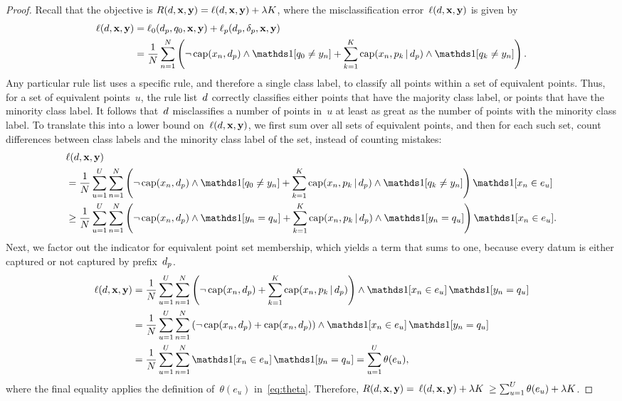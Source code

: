 \begin{arxiv}
\begin{proof}
Recall that the objective is ${R({d}, \mathbf{x}, \mathbf{y}) = \ell({d}, \mathbf{x}, \mathbf{y}) + {\lambda} K}$,
where the misclassification error~${\ell({d}, \mathbf{x}, \mathbf{y})}$ is given by
\begin{align}
\Loss(\RL, \x, \y) &= \Loss_0(\Prefix, \Default, \x, \y) + \Loss_p(\Prefix, \Labels, \x, \y) \nn \\
&= \frac{1}{N} \sum_{n=1}^N \left( \neg\, \Cap(x_n, \Prefix) \wedge \one[q_0 \neq y_n]
   + \sum_{k=1}^K \Cap(x_n, p_k \given \Prefix) \wedge \one [q_k \neq y_n] \right).
\end{align}
Any particular rule list uses a specific rule, and therefore a single class label,
to classify all points within a set of equivalent points.
%
Thus, for a set of equivalent points~$u$, the rule list~${d}$ correctly classifies either
points that have the majority class label, or points that have the minority class label.
%
It follows that~${d}$ misclassifies a number of points in~$u$ at least as great as
the number of points with the minority class label.
%
To translate this into a lower bound on~$\ell({d}, \mathbf{x}, \mathbf{y})$,
we first sum over all sets of equivalent points, and then for each such set,
count differences between class labels and the minority class label of the set,
instead of counting mistakes:
\begin{align}
&\Loss(\RL, \x, \y) \nn \\
&= \frac{1}{N} \sum_{u=1}^U \sum_{n=1}^N \left( \neg\, \Cap(x_n, \Prefix) \wedge \one[q_0 \neq y_n]
   + \sum_{k=1}^K \Cap(x_n, p_k \given \Prefix) \wedge \one [q_k \neq y_n] \right)
   \one [x_n \in e_u]  \nn \\
&\ge \frac{1}{N} \sum_{u=1}^U \sum_{n=1}^N \left( \neg\, \Cap(x_n, \Prefix) \wedge \one[y_n = q_u]
   + \sum_{k=1}^K \Cap(x_n, p_k \given \Prefix) \wedge \one [y_n = q_u] \right)
   \one [x_n \in e_u].
\label{eq:lb-equiv-pts}
\end{align}
Next, we factor out the indicator for equivalent point set membership,
which yields a term that sums to one, because every datum is either captured or
not captured by prefix~$d_p$.
\begin{align}
\Loss(\RL, \x, \y) &= \frac{1}{N} \sum_{u=1}^U \sum_{n=1}^N \left( \neg\, \Cap(x_n, \Prefix)
   + \sum_{k=1}^K \Cap(x_n, p_k \given \Prefix) \right)
   \wedge \one [x_n \in e_u]\, \one[y_n = q_u] \nn \\
&= \frac{1}{N} \sum_{u=1}^U \sum_{n=1}^N \left( \neg\, \Cap(x_n, \Prefix)
   + \Cap(x_n, \Prefix) \right)
   \wedge \one [x_n \in e_u]\, \one[y_n = q_u] \nn \\
&= \frac{1}{N} \sum_{u=1}^U \sum_{n=1}^N \one [ x_n \in e_u ]\, \one [ y_n = q_u ]
= \sum_{u=1}^U \theta(e_u),
\end{align}
where the final equality applies the definition of~$\theta(e_u)$ in~\eqref{eq:theta}.
%
Therefore, ${R({d}, \mathbf{x}, \mathbf{y}) =}$ ${\ell({d}, \mathbf{x}, \mathbf{y}) + {\lambda} K}$ ${\ge \sum_{u=1}^U \theta(e_u) + {\lambda} K}$.
\end{proof}
\end{arxiv}

